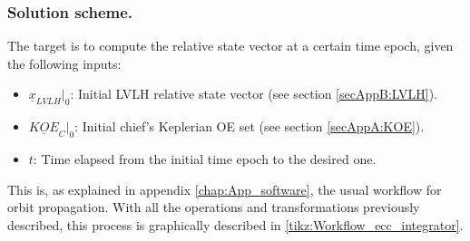 		\subsubsection{Solution scheme.}
		\indent The target is to compute the relative state vector at a certain time epoch, given the following inputs:
		\begin{itemize}
		\item $\underline{x}_{LVLH}\rvert_{0}$: Initial LVLH relative state vector (see section \ref{secAppB:LVLH}).
		\item $\underline{KOE}_C\rvert_{0}$: Initial chief's Keplerian OE set (see section \ref{secAppA:KOE}).
		\item $t$: Time elapsed from the initial time epoch to the desired one.
		\end{itemize}
		\indent This is, as explained in appendix \ref{chap:App_software}, the usual workflow for orbit propagation. With all the operations and transformations previously described, this process is graphically described in \ref{tikz:Workflow_ecc_integrator}.
		
